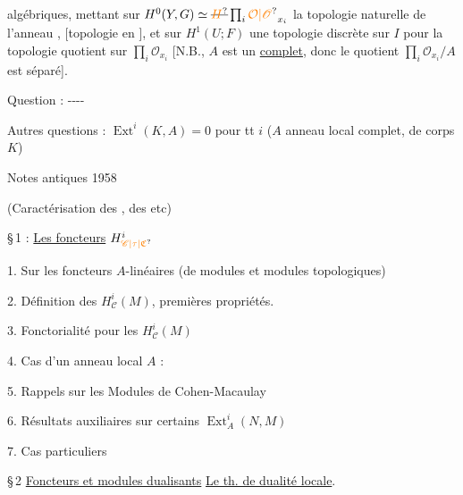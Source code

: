 algébriques,  mettant sur $H^0(Y,G)\simeq\deleted{\unsure{H}}\prod_i\unsure{\mathcal O|\mathscr O}_{x_i}$ la topologie
 naturelle de l'anneau ,
[topologie  en ], et sur $H^1(U;F)$ une
topologie    discrète  sur $I$ pour la
topologie quotient sur $\prod_i\mathcal O_{x_i}$ [N.B., $A$ est un
 \uline{complet}, donc le quotient $\prod_i\mathcal O_{x_i}/A$
est séparé].

Question :  \mbox{-{}-{}-{}-}

Autres questions : $\operatorname{Ext}^i(K,A)=0$ pour tt $i$ ($A$ anneau local
  complet, de corps $K$)

Notes antiques \hfill 1958

(Caractérisation des
, des
 etc)

\S\,1 : \uline{Les foncteurs} $H^i_{\unsure{\mathscr C|\tau|\mathfrak C}}$

\noindent{}%
1. Sur les foncteurs $A$-linéaires (de modules et modules topologiques)

2. Définition des $H^i_{\mathscr C}(M)$, premières propriétés.

3. Fonctorialité pour les $H^i_{\mathscr C}(M)$ 

4. Cas d'un anneau local $A$ : 

5.  Rappels sur les Modules de Cohen-Macaulay

6. Résultats auxiliaires sur certains $\operatorname{Ext}_A^i(N,M)$ \margin{[$M$ \unsure{Ch. Mac|Coh. Mac.} de supp. $\operatorname{Spec}(A)$}

7. Cas particuliers

\S\,2 \uline{Foncteurs et modules dualisants}  \uline{Le th. de dualité locale}.

